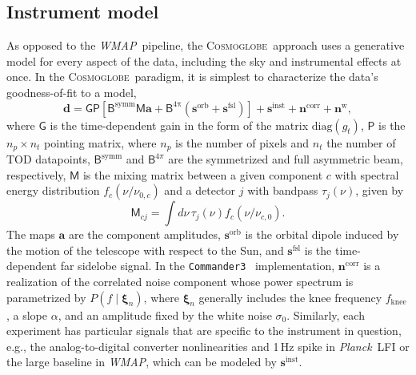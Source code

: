 \documentclass[twocolumn]{../../common/aa}
\def\WMAP{\emph{WMAP}}
\def\Planck{\emph{Planck}}
\def\commanderthree{\texttt{Commander3}}
\newcommand{\cosmoglobe}{\textsc{Cosmoglobe}}
\begin{document}
\subsection{Instrument model}
\label{sec:wmap_instmodel}

As opposed to the \WMAP\ pipeline, the \cosmoglobe\ approach uses a generative model for every aspect of the data, including the sky and instrumental effects at once.
In the \cosmoglobe\ paradigm, it is simplest to characterize the data's goodness-of-fit to a model,
\begin{equation}
	\label{eq:model}
	\boldsymbol d =\mathsf G\mathsf P[\mathsf B^\mathrm{symm}\mathsf M\boldsymbol a+\mathsf B^\mathrm{4\pi}(\boldsymbol s^\mathrm{orb}
	+\boldsymbol s^\mathrm{fsl})] + \boldsymbol s^\mathrm{inst}+\boldsymbol n^\mathrm{corr}+\boldsymbol n^\mathrm w,
\end{equation}
where $\mathsf G$ is the time-dependent gain in the form of the matrix $\mathrm{diag}(g_t)$, $\mathsf P$ is the $n_p\times n_t$ pointing matrix, where $n_p$ is the number of pixels and $n_t$ the number of TOD datapoints,
$\mathsf B^\mathrm{symm}$ and $\mathsf B^{4\pi}$ are the symmetrized and full asymmetric beam, respectively, $\mathsf M$ is the mixing matrix between a given component $c$ with spectral energy distribution $f_c(\nu/\nu_{0,c})$ and a detector $j$ with bandpass $\tau_j(\nu)$, given by
\begin{equation}
	\mathsf M_{cj}=\int d\nu\,\tau_j(\nu)f_c(\nu/\nu_{c,0}).
\end{equation}
The maps $\boldsymbol a$ are the component amplitudes, $\boldsymbol s^\mathrm{orb}$ is the orbital dipole induced by the motion of the telescope with respect to the Sun, and $\boldsymbol s^\mathrm{fsl}$ is the time-dependent far sidelobe signal. In the \commanderthree\ \citep{bp03} implementation, $\boldsymbol n^\mathrm{corr}$ is a realization of the correlated noise component whose power spectrum is parametrized by $P(f\mid\boldsymbol\xi_n)$, where $\boldsymbol\xi_n$ generally includes the knee frequency $f_\mathrm{knee}$, a slope $\alpha$, and an amplitude fixed by the white noise $\sigma_0$. 
Similarly, each experiment has particular signals that are specific to the instrument in question, e.g., the analog-to-digital converter nonlinearities \citep{bp25} and 1\,Hz spike in \Planck\ LFI or the large baseline in \WMAP, which can be modeled by $\boldsymbol s^\mathrm{inst}$. 
\end{document}
